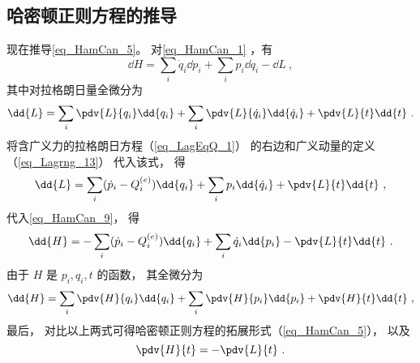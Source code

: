 \subsection{哈密顿正则方程的推导}
现在推导\autoref{eq_HamCan_5}。 对\autoref{eq_HamCan_1} ，有
\begin{equation}\label{eq_HamCan_9}
\dd{H} = \sum_i \dot q_i \dd{p_i} + \sum_i p_i \dd{\dot q_i} - \dd{L}~,
\end{equation}
其中对拉格朗日量全微分为
\begin{equation}
\dd{L} = \sum_i \pdv{L}{q_i}\dd{q_i} + \sum_i \pdv{L}{\dot q_i}\dd{\dot q_i} + \pdv{L}{t}\dd{t}~.
\end{equation}
将含广义力的拉格朗日方程（\autoref{eq_LagEqQ_1}） 的右边和广义动量的定义（\autoref{eq_Lagrng_13}） 代入该式， 得
\begin{equation}
\dd{L} = \sum_i (\dot p_i - Q_i^{(e)})\dd{q_i} + \sum_i p_i\dd{\dot q_i} + \pdv{L}{t}\dd{t}~,
\end{equation}
代入\autoref{eq_HamCan_9}， 得
\begin{equation}
\dd{H} = - \sum_i (\dot p_i - Q_i^{(e)}) \dd{q_i} + \sum_i \dot q_i \dd{p_i}  - \pdv{L}{t}\dd{t}~.
\end{equation}
由于 $H$ 是 $p_i, q_i, t$ 的函数， 其全微分为 
\begin{equation}
\dd{H} = \sum_i \pdv{H}{q_i}\dd{q_i} + \sum_i \pdv{H}{p_i}\dd{p_i} + \pdv{H}{t}\dd{t}~,
\end{equation}
最后， 对比以上两式可得哈密顿正则方程的拓展形式（\autoref{eq_HamCan_5}）， 以及
\begin{equation}
\pdv{H}{t} = - \pdv{L}{t}~.
\end{equation}
